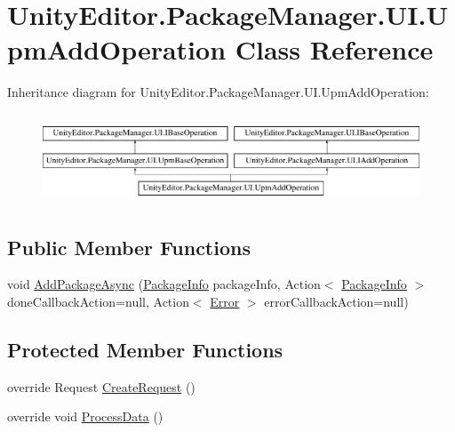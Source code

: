 \hypertarget{class_unity_editor_1_1_package_manager_1_1_u_i_1_1_upm_add_operation}{}\section{Unity\+Editor.\+Package\+Manager.\+U\+I.\+Upm\+Add\+Operation Class Reference}
\label{class_unity_editor_1_1_package_manager_1_1_u_i_1_1_upm_add_operation}
Inheritance diagram for Unity\+Editor.\+Package\+Manager.\+U\+I.\+Upm\+Add\+Operation\+:\begin{figure}[H]
\begin{center}
\leavevmode
\includegraphics[height=2.692308cm]{class_unity_editor_1_1_package_manager_1_1_u_i_1_1_upm_add_operation}
\end{center}
\end{figure}
\subsection*{Public Member Functions}
\begin{DoxyCompactItemize}
\item 
void \mbox{\hyperlink{class_unity_editor_1_1_package_manager_1_1_u_i_1_1_upm_add_operation_ae93614e9b995f7c8fcf0456c38be1cdd}{Add\+Package\+Async}} (\mbox{\hyperlink{class_unity_editor_1_1_package_manager_1_1_u_i_1_1_package_info}{Package\+Info}} package\+Info, Action$<$ \mbox{\hyperlink{class_unity_editor_1_1_package_manager_1_1_u_i_1_1_package_info}{Package\+Info}} $>$ done\+Callback\+Action=null, Action$<$ \mbox{\hyperlink{class_unity_editor_1_1_package_manager_1_1_u_i_1_1_upm_base_operation_a116dcc466d587905084e826b47f7e05b}{Error}} $>$ error\+Callback\+Action=null)
\end{DoxyCompactItemize}
\subsection*{Protected Member Functions}
\begin{DoxyCompactItemize}
\item 
override Request \mbox{\hyperlink{class_unity_editor_1_1_package_manager_1_1_u_i_1_1_upm_add_operation_a5b4cbf090d82606a14caf9fd90ccd0c0}{Create\+Request}} ()
\item 
override void \mbox{\hyperlink{class_unity_editor_1_1_package_manager_1_1_u_i_1_1_upm_add_operation_afcf098692ff87d8f0b657a5c52e165b2}{Process\+Data}} ()
\end{DoxyCompactItemize}
